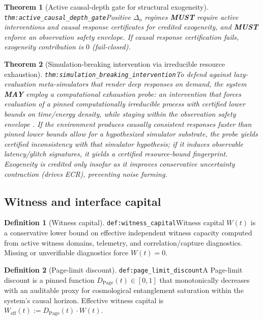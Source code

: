 \documentclass[11pt]{article}
\theoremstyle{definition}
\newtheorem{definition}{Definition}
\theoremstyle{plain}
\newtheorem{theorem}{Theorem}
\newcommand{\MUST}{\textbf{MUST}}
\newcommand{\MAY}{\textbf{MAY}}
\newcommand{\lbl}[1]{\texttt{\footnotesize\nolinkurl{#1}}}
\newcommand{\DefLabel}[1]{\hfill{\small\lbl{#1}}}
\newcommand{\deltao}{\Delta_o}
\begin{document}
\begin{theorem}[Active causal-depth gate for structural exogeneity]\DefLabel{thm:active_causal_depth_gate}\label{thm:active_causal_depth_gate}
Positive $\deltao$ regimes \MUST{} require active interventions and causal response certificates for credited exogeneity, and \MUST{} enforce an observation safety envelope.
If causal response certification fails, exogeneity contribution is $0$ (fail-closed).
\end{theorem}

\begin{theorem}[Simulation-breaking intervention via irreducible resource exhaustion]\DefLabel{thm:simulation_breaking_intervention}\label{thm:simulation_breaking_intervention}
To defend against lazy-evaluation meta-simulators that render deep responses on demand, the system \MAY{} employ a computational exhaustion probe: an intervention that forces evaluation of a pinned computationally irreducible process with certified lower bounds on time/energy density, while staying within the observation safety envelope \cite{BennettDepth}.
If the environment produces causally consistent responses faster than pinned lower bounds allow for a hypothesized simulator substrate, the probe yields certified inconsistency with that simulator hypothesis; if it induces observable latency/glitch signatures, it yields a certified resource-bound fingerprint.
Exogeneity is credited only insofar as it improves conservative uncertainty contraction (drives ECR), preventing noise farming.
\end{theorem}

\subsection{Witness and interface capital}
\begin{definition}[Witness capital]\DefLabel{def:witness_capital}\label{def:witness_capital}
Witness capital $W(t)$ is a conservative lower bound on effective independent witness capacity computed from active witness domains, telemetry, and correlation/capture diagnostics.
Missing or unverifiable diagnostics force $W(t)=0$.
\end{definition}

\begin{definition}[Page-limit discount]\DefLabel{def:page_limit_discount}\label{def:page_limit_discount}
A Page-limit discount is a pinned function $D_{\mathrm{Page}}(t)\in[0,1]$ that monotonically decreases with an auditable proxy for cosmological entanglement saturation within the system's causal horizon.
Effective witness capital is $W_{\mathrm{eff}}(t):=D_{\mathrm{Page}}(t)\cdot W(t)$.
\end{definition}
\end{document}
